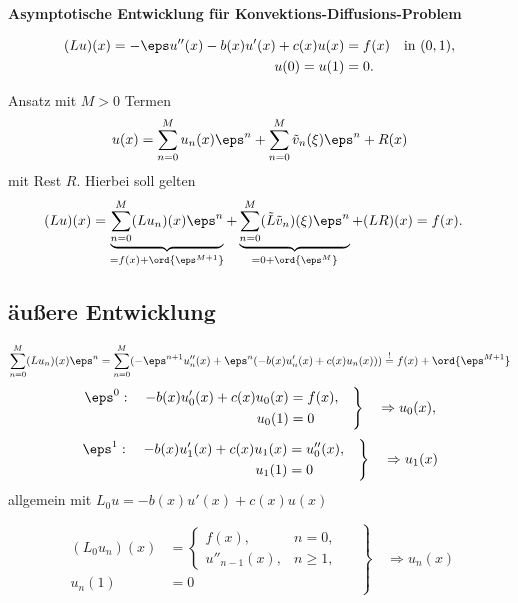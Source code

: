 \documentclass[12pt]{article}
\begin{document}
   \begin{center}
      \Large\textbf{
       Asymptotische Entwicklung für Konvektions-Diffusions-Problem}
   \end{center}
   \begin{tcolorbox}
      \begin{align*}
          (Lu)(x)=-\eps u''(x)-b(x) u'(x)+c(x)u(x)&=f(x)\quad\mbox{in }(0,1),\\
          u(0)=u(1)&=0.
      \end{align*}
   \end{tcolorbox}

   Ansatz mit $M>0$ Termen
   \[
       u(x)=\sum_{n=0}^Mu_n(x)\eps^n+\sum_{n=0}^M\tilde v_n(\xi)\eps^n+R(x)
   \]
   mit Rest $R$. Hierbei soll gelten
   \begin{align*}
       (Lu)(x)= \underbrace{\sum_{n=0}^M(Lu_n)(x)\eps^n}_{=f(x)+\ord{\eps^{M+1}}}
               +\underbrace{\sum_{n=0}^M(\tilde L\tilde v_n)(\xi)\eps^n}_{=0+\ord{\eps^{M}}}+(LR)(x)&=f(x).
   \end{align*}
   \subsection*{äußere Entwicklung}
   \[
    \sum_{n=0}^M(Lu_n)(x)\eps^n
     = \sum_{n=0}^M(-\eps^{n+1} u''_n(x)+\eps^n(-b(x)u'_n(x)+c(x)u_n(x)))\stackrel{!}{=}f(x)+\ord{\eps^{M+1}}
   \]
   \[
      \left.
      \begin{aligned}
        \eps^0:\quad -b(x)u'_0(x)+c(x)u_0(x) &= f(x),\\
                                      u_0(1) &= 0
      \end{aligned}\quad
      \right\}\quad\Rightarrow
      u_0(x),
   \]
   \[
      \left.
      \begin{aligned}
        \eps^1:\quad -b(x)u'_1(x)+c(x)u_1(x) &= u''_0(x),\\
                                      u_1(1) &= 0
      \end{aligned}\quad
      \right\}\quad\Rightarrow
      u_1(x)
   \]
   allgemein mit $L_0u=-b(x)u'(x)+c(x)u(x)$
   \begin{tcolorbox}
      \begin{equation}
         \left.
         \begin{aligned}
          (L_0 u_n)(x)&=\begin{cases}
                        f(x),&n=0,\\
                        u''_{n-1}(x),&n\geq 1,
                       \end{cases}\\
               u_n(1)&=0
         \end{aligned}
         \quad
         \right\}
         \quad\Rightarrow
         u_n(x)\label{eq:un}
      \end{equation}
   \end{tcolorbox}
\end{document}
